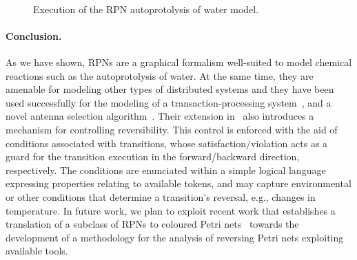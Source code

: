 \documentclass[runningheads]{llncs}
\begin{document}
\begin{figure}[t]
	\\\vspace{-0.25cm}
	\caption{Execution of the RPN autoprotolysis of water model.}
	\label{execution}
\end{figure}

\paragraph{Conclusion.} As we have shown, RPNs are a graphical
formalism well-suited to model chemical reactions such
as the autoprotolysis of water. At the same time, they are amenable for modeling
other types of distributed systems and they have been used successfully for
the modeling of a transaction-processing system~\cite{RPNs}, and a novel antenna selection  algorithm~\cite{CRPNs}. Their extension in~\cite{CRPNs} also introduces
a mechanism for controlling reversibility. This control is
enforced with the aid of conditions associated with transitions, whose satisfaction/violation
acts as a guard for the transition execution in the forward/backward direction, respectively. 
The conditions are enunciated within a simple logical language expressing properties 
relating to available tokens, and 
may capture environmental or other conditions that determine a transition's
reversal, e.g., changes in temperature. In future work, we plan to exploit recent work
that establishes a translation of a subclass of RPNs to coloured Petri nets~\cite{RPNtoCPN} towards
the development of a methodology for the analysis of reversing Petri nets exploiting
available tools.
\end{document}
